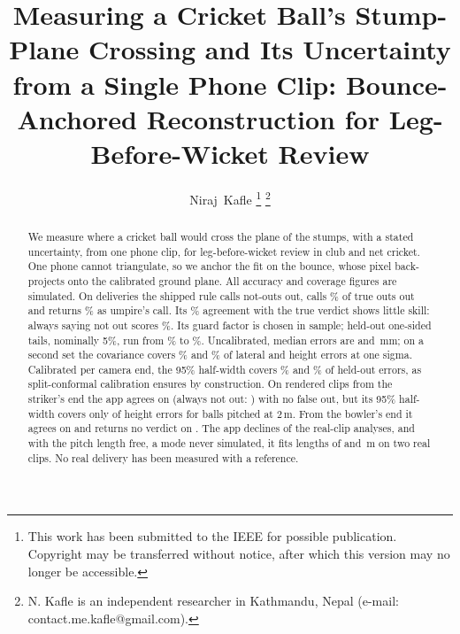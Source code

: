 \documentclass[journal]{IEEEtran}
\begin{document}

\title{Measuring a Cricket Ball's Stump-Plane Crossing and Its Uncertainty from a Single Phone Clip:
Bounce-Anchored Reconstruction for Leg-Before-Wicket Review}

\author{Niraj~Kafle%
\thanks{This work has been submitted to the IEEE for possible publication. Copyright may be transferred without notice, after which this version may no longer be accessible.}%
\thanks{N. Kafle is an independent researcher in Kathmandu, Nepal (e-mail: contact.me.kafle@gmail.com).}}


\maketitle

\begin{abstract}
We measure where a cricket ball would cross the plane of the stumps, with a stated uncertainty, from one
phone clip, for leg-before-wicket review in club and net cricket. One phone cannot triangulate, so we anchor
the fit on the bounce, whose pixel back-projects onto the calibrated ground plane. All accuracy and coverage
figures are simulated. On \RiskN{} deliveries the shipped rule calls \RiskCalFalseOutFive{}
not-outs out, calls \RiskCalOutRecallFive\% of true outs out and returns \RiskCalOutToUmpFive\% as umpire's
call. Its \RiskCalAgreeFive\% agreement with the true verdict shows little skill: always saying not out
scores \RiskAlwaysNotOutPct\%. Its guard factor is chosen in sample; held-out one-sided tails, nominally
5\%, run from \CalExceedMin\% to \CalExceedMax\%. Uncalibrated, median errors are
\GeoMedYAll{} and \GeoMedZAll\,mm; on a second set the covariance covers \CovBFitYOne\% and \CovBFitZOne\% of
lateral and height errors at one sigma. Calibrated per camera end, the 95\% half-width covers
\CalYCovNinetyfive\% and \CalZCovNinetyfive\% of held-out errors, as split-conformal calibration ensures by
construction. On \EteN{} rendered clips from the striker's end the app agrees on \EteAgree{} (always not
out: \EteNotOutTruth) with no false out, but its 95\% half-width covers only \EteCoverZLenTwo{} of
\EteCoverZLenTwoN{} height errors for balls pitched at 2\,m. From the bowler's end it agrees on
\EteBowlerAgree{} and returns no verdict on \EteBowlerNoVerdict. The app declines \RealDeclinedRuns{} of
the \RealRuns{} real-clip analyses, and with the pitch length free, a mode never simulated, it fits lengths
of \RealTestFourLength{} and \RealTestFiveLength\,m on two real clips. No real delivery has been measured
with a reference.
\end{abstract}
\end{document}
